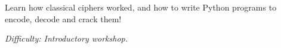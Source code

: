%
%
%

\newif\ifprint
\printtrue



\newcommand{\workshopTitle}{Workshop 16: Ciphers}

\newcommand{\workshopAuthor}{Written by Jack Kelly}



	
	
	Learn how classical ciphers worked, and how to write Python programs to encode, decode and crack them!
	
	\textit{Difficulty: Introductory workshop.}
	
	\ifprint
		\renewcommand{\baselinestretch}{0.75}\normalsize
		\tableofcontents
		\renewcommand{\baselinestretch}{1.0}\normalsize
	\else
		\tableofcontents
	\fi
	
	
	
	\clearpage
	
	
	\webclearpage
	
		
	
	\webclearpage

		
	

